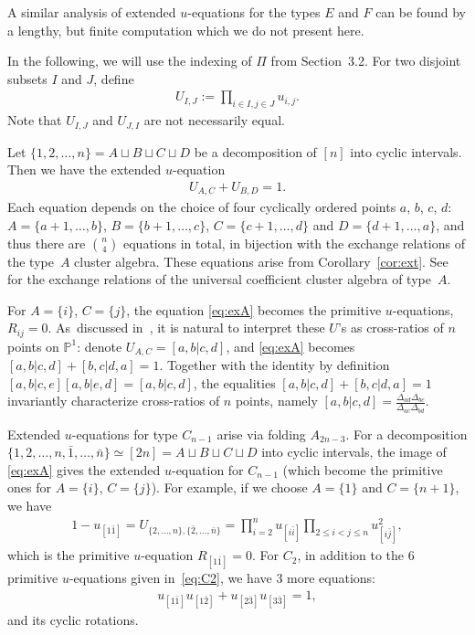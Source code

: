 \documentclass[pdftex]{sigma}%
\renewcommand{\P}{{\mathbb P}}
\numberwithin{equation}{section}
\begin{document}
A similar analysis of extended $u$-equations for the types $E$ and $F$ can be found by a lengthy, but finite computation which we do not present here.

In the following, we will use the indexing of $\Pi$ from Section~3.2. For two disjoint subsets $I$ and $J$, define
\begin{gather}\label{eq:UIJ}
U_{I, J}:=\prod_{i \in I, j\in J} u_{i,j}.
\end{gather}
Note that $U_{I,J}$ and $U_{J,I}$ are not necessarily equal.

\medskip{} %
Let $\{1,2,\dots, n\} = A \sqcup B \sqcup C \sqcup D$ be a decomposition of $[n]$ into cyclic intervals.
Then we have the extended $u$-equation
\begin{gather}\label{eq:exA}
U_{A,C}+U_{B,D}=1.
\end{gather}
Each equation depends on the choice of four cyclically ordered points $a$, $b$, $c$, $d$: $A=\{a{+}1, \dots, b\}$, $B=\{b{+}1, \dots, c\}$, $C=\{c{+}1, \dots, d\}$ and $D=\{d{+}1, \dots, a\}$, and thus there are $\binom{n}{4}$ equations in total, in bijection with the exchange relations of the type~$A$ cluster algebra. These equations arise from Corollary~\ref{cor:ext}. See \cite[Proposition~7.2]{YZ} for the exchange relations of the universal coefficient cluster algebra of type~$A$.

For $A=\{i\}$, $C=\{j\}$, the equation \eqref{eq:exA} becomes the primitive $u$-equations, $R_{ij}=0$.
As~discussed in~\cite{AHLT,Brown}, it is natural to interpret these $U$'s as cross-ratios of $n$ points on $\P^1$: denote $U_{A,C}=[a,b|c,d]$, and \eqref{eq:exA} becomes $[a, b | c, d]+[b, c | d, a]=1$. Together with the identity by definition $[a, b | c, e] [a, b | e, d]=[a, b | c, d]$, the equalities $[a, b | c, d]+[b, c | d, a]=1$ invariantly characterize cross-ratios of $n$ points, namely $[a, b | c, d]=\frac{\Delta_{a d}\Delta_{ b c}}{\Delta_{a c}\Delta_{b d}}$.

\medskip{}
Extended $u$-equations for type $C_{n-1}$ arise via folding $A_{2n-3}$.
For a decomposition $\big\{1,2,\dots,n,\bar 1,\dots, \bar n\big\} \simeq [2n] = A\sqcup B\sqcup C\sqcup D$ into cyclic intervals, the image of \eqref{eq:exA} gives the extended $u$-equation for $C_{n{-}1}$ (which become the primitive ones for $A=\{i\}$, $C=\{j\}$). For example, if we choose $A=\{1\}$ and $C=\{n{+}1\}$, we have
\begin{gather*}
1-u_{[1 \bar 1]}=U_{\{2,\dots, n\}, \{\bar 2,\dots, \bar n\}}
=\prod_{i=2}^n u_{[i \bar i]} \prod_{2\leq i<j\leq n} u_{[i \bar j]}^2,
\end{gather*}
which is the primitive $u$-equation $R_{[1 \bar 1]} = 0$. For $C_2$, in addition to the $6$ primitive $u$-equations given in~\eqref{eq:C2}, we have $3$ more equations:
\begin{gather}\label{eq:exC2}
 u_{[1 \bar{1}]} u_{[1 \bar{2}]}+ u_{[2 \bar{3}]} u_{[3 \bar{3}]}=1,
 \end{gather}
and its cyclic rotations.
\end{document}
